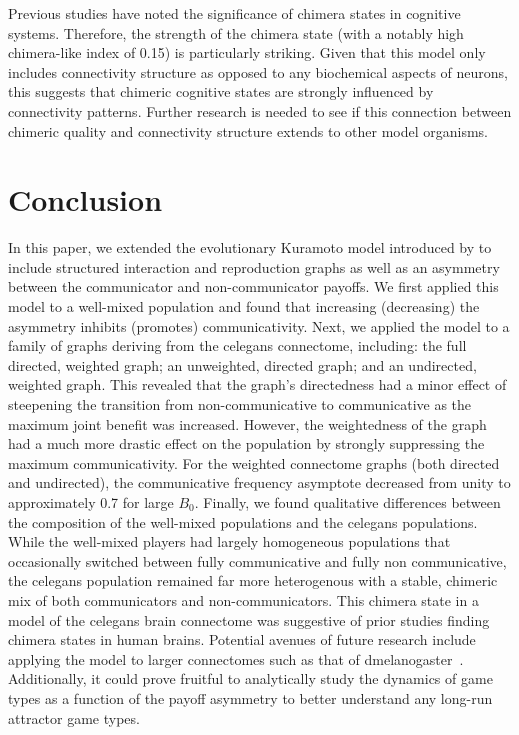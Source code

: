 \documentclass[pdflatex,lineno,referee,sn-mathphys-ay]{sn-jnl}
\begin{document}
Previous studies \citep[\eg][]{bansal2019cognitive,santos2017chimera}
have noted the significance of chimera states in cognitive systems.
Therefore, the strength of the chimera state
(with a notably high chimera-like index of \num{0.15}) is particularly striking.
Given that this model only includes connectivity structure
as opposed to any biochemical aspects of neurons,
this suggests that chimeric cognitive states are strongly influenced
by connectivity patterns.
Further research is needed to see if this connection between chimeric quality
and connectivity structure extends to other model organisms.

\section{Conclusion}
In this paper, we extended the evolutionary Kuramoto model
introduced by \citet{tripp2022evolutionary}
to include structured interaction and reproduction graphs
as well as an asymmetry between
the communicator and non-communicator payoffs.
We first applied this model to a well-mixed population
and found that increasing (decreasing) the asymmetry
inhibits (promotes) communicativity.
Next, we applied the model to
a family of graphs deriving from the \gls{celegans} connectome,
including: the full directed, weighted graph;
an unweighted, directed graph;
and an undirected, weighted graph.
This revealed that the graph's directedness
had a minor effect of steepening the transition
from non-communicative to communicative
as the maximum joint benefit was increased.
However, the weightedness of the graph had a much more drastic effect
on the population by strongly suppressing the maximum communicativity.
For the weighted connectome graphs (both directed and undirected),
the communicative frequency asymptote decreased from unity
to approximately \num{0.7} for large $B_0$.
Finally, we found qualitative differences between the composition
of the well-mixed populations and the \gls{celegans} populations.
While the well-mixed players had largely homogeneous populations
that occasionally switched between fully communicative
and fully non communicative,
the \gls{celegans} population remained far more heterogenous
with a stable, chimeric mix of both communicators and non-communicators.
This chimera state in a model of the \gls{celegans} brain connectome
was suggestive of prior studies finding chimera states in human brains.
Potential avenues of future research include applying the model
to larger connectomes such as that
of \gls{dmelanogaster}~\citep{schlegel2024whole}.
Additionally, it could prove fruitful to analytically study
the dynamics of game types as a function of the payoff asymmetry
to better understand any long-run attractor game types.


\backmatter



\appendix

\end{document}
